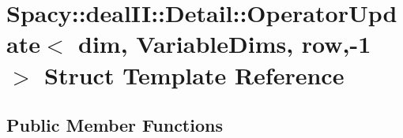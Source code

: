 \hypertarget{structSpacy_1_1dealII_1_1Detail_1_1OperatorUpdate_3_01dim_00_01VariableDims_00_01row_00-1_01_4}{\section{Spacy\-:\-:deal\-I\-I\-:\-:Detail\-:\-:Operator\-Update$<$ dim, Variable\-Dims, row,-\/1 $>$ Struct Template Reference}
\label{structSpacy_1_1dealII_1_1Detail_1_1OperatorUpdate_3_01dim_00_01VariableDims_00_01row_00-1_01_4}
}
\subsection*{Public Member Functions}
